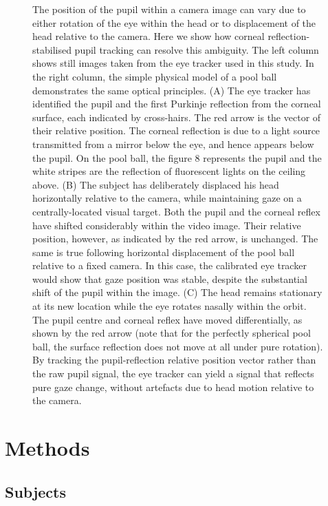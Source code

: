 \documentclass[jou,a4paper]{apa6}
\begin{document}
\begin{figure}[htbp]
\begin{center}
\caption{The position of the pupil within a camera image can vary due to either rotation of the eye within the head or to displacement of the head relative to the camera. Here we show how corneal reflection-stabilised pupil tracking can resolve this ambiguity. The left column shows still images taken from the eye tracker used in this study. In the right column, the simple physical model of a pool ball demonstrates the same optical principles. (A) The eye tracker has identified the pupil and the first Purkinje reflection from the corneal surface, each indicated by cross-hairs. The red arrow is the vector of their relative position. The corneal reflection is due to a light source transmitted from a mirror below the eye, and hence appears below the pupil. On the pool ball, the figure 8 represents the pupil and the white stripes are the reflection of fluorescent lights on the ceiling above. (B) The subject has deliberately displaced his head horizontally relative to the camera, while maintaining gaze on a centrally-located visual target. Both the pupil and the corneal reflex have shifted considerably within the video image. Their relative position, however, as indicated by the red arrow, is unchanged. The same is true following horizontal displacement of the pool ball relative to a fixed camera. In this case, the calibrated eye tracker would show that gaze position was stable, despite the substantial shift of the pupil within the image. (C) The head remains stationary at its new location while the eye rotates nasally within the orbit. The pupil centre and corneal reflex have moved differentially, as shown by the red arrow (note that for the perfectly spherical pool ball, the surface reflection does not move at all under pure rotation). By tracking the pupil-reflection relative position vector rather than the raw pupil signal, the eye tracker can yield a signal that reflects pure gaze change, without artefacts due to head motion relative to the camera.}
\label{fig:PCCR}
\end{center}
\end{figure}

\section{Methods}

\subsection{Subjects}
\end{document}
